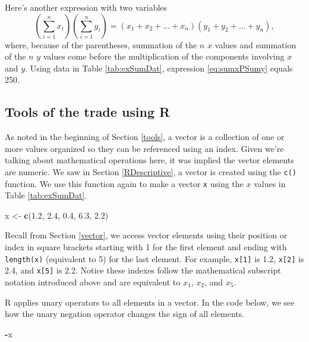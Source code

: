 \documentclass[
  11pt,
]{krantz}
\newenvironment{Shaded}{\begin{snugshade}}{\end{snugshade}}
\newcommand{\FloatTok}[1]{\textcolor[rgb]{0.00,0.00,0.81}{#1}}
\newcommand{\KeywordTok}[1]{\textcolor[rgb]{0.13,0.29,0.53}{\textbf{#1}}}
\newcommand{\NormalTok}[1]{#1}
\newcommand{\OperatorTok}[1]{\textcolor[rgb]{0.81,0.36,0.00}{\textbf{#1}}}
\newcommand{\StringTok}[1]{\textcolor[rgb]{0.31,0.60,0.02}{#1}}
\theoremstyle{definition}
\theoremstyle{definition}
\theoremstyle{definition}
\theoremstyle{definition}
\theoremstyle{remark}
\begin{document}
Here's another expression with two variables
\begin{equation} 
\left(\sum^n_{i=1}x_i\right)\left(\sum^n_{i=1}y_i\right) = (x_1 + x_2 + \ldots + x_n)(y_1 + y_2 + \ldots + y_n),
\label{eq:sumxPSumy}
\end{equation}
where, because of the parentheses, summation of the \(n\) \(x\) values and summation of the \(n\) \(y\) values come before the multiplication of the components involving \(x\) and \(y\). Using data in Table \ref{tab:exSumDat}, expression \eqref{eq:sumxPSumy} equals 250.

\hypertarget{toolsR}{%
\subsection{Tools of the trade using R}\label{toolsR}}

As noted in the beginning of Section \ref{tools}, a vector is a collection of one or more values organized so they can be referenced using an index. Given we're talking about mathematical operations here, it was implied the vector elements are numeric. We saw in Section \ref{RDescriptive}, a vector is created using the \texttt{c()} function. We use this function again to make a vector \texttt{x} using the \(x\) values in Table \ref{tab:exSumDat}.

\begin{Shaded}
\begin{Highlighting}[]
\NormalTok{x \textless{}{-}}\StringTok{ }\KeywordTok{c}\NormalTok{(}\FloatTok{1.2}\NormalTok{, }\FloatTok{2.4}\NormalTok{, }\FloatTok{0.4}\NormalTok{, }\FloatTok{6.3}\NormalTok{, }\FloatTok{2.2}\NormalTok{)}
\end{Highlighting}
\end{Shaded}

Recall from Section \ref{vector}, we access vector elements using their position or index in square brackets starting with 1 for the first element and ending with \texttt{length(x)} (equivalent to 5) for the last element. For example, \texttt{x{[}1{]}} is 1.2, \texttt{x{[}2{]}} is 2.4, and \texttt{x{[}5{]}} is 2.2. Notice these indexes follow the mathematical subscript notation introduced above and are equivalent to \(x_1\), \(x_2\), and \(x_5\).

R applies unary operators to all elements in a vector. In the code below, we see how the unary negation operator changes the sign of all elements.

\begin{Shaded}
\begin{Highlighting}[]
\OperatorTok{{-}}\NormalTok{x}
\end{Highlighting}
\end{Shaded}
\end{document}
